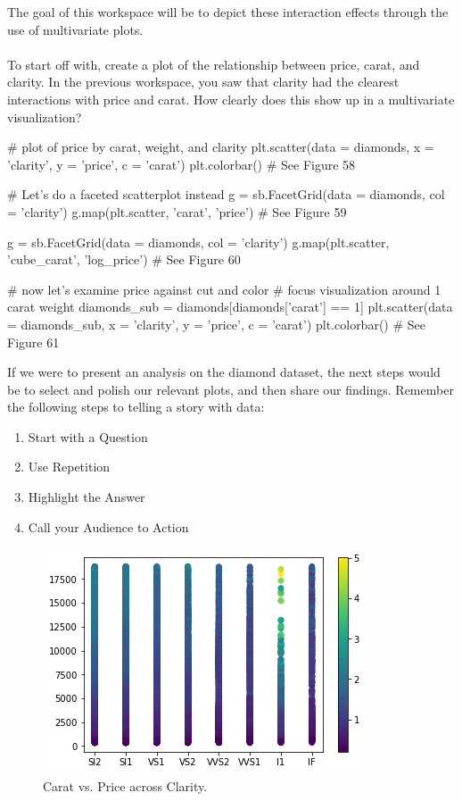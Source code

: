 The goal of this workspace will be to depict these interaction effects through the use of multivariate plots.
\\\\

To start off with, create a plot of the relationship between price, carat, and clarity. In the previous workspace, you saw that clarity had the clearest interactions with price and carat. How clearly does this show up in a multivariate visualization?

\begin{python}
	# plot of price by carat, weight, and clarity
	plt.scatter(data = diamonds, x = 'clarity', y = 'price', c = 'carat')
	plt.colorbar()
	# See Figure 58
	
	# Let's do a faceted scatterplot instead
	g = sb.FacetGrid(data = diamonds, col = 'clarity')
	g.map(plt.scatter, 'carat', 'price')
	# See Figure 59
	
	g = sb.FacetGrid(data = diamonds, col = 'clarity')
	g.map(plt.scatter, 'cube_carat', 'log_price')
	# See Figure 60
	
	# now let's examine price against cut and color
	# focus visualization around 1 carat weight
	diamonds_sub = diamonds[diamonds['carat'] == 1]
	plt.scatter(data = diamonds_sub, x = 'clarity', y = 'price', c = 'carat')
	plt.colorbar()
	# See Figure 61
\end{python}

If we were to present an analysis on the diamond dataset, the next steps would be to select and polish our relevant plots, and then share our findings. Remember the following steps to telling a story with data:

\begin{enumerate}
	\item Start with a Question
	\item Use Repetition
	\item Highlight the Answer
	\item Call your Audience to Action
\end{enumerate}

\begin{figure}
	\includegraphics[width=\textwidth,height=\textheight,keepaspectratio]{images/figure58.png}
	\caption{Carat vs. Price across Clarity.}\label{fig:figure58}
\end{figure}


